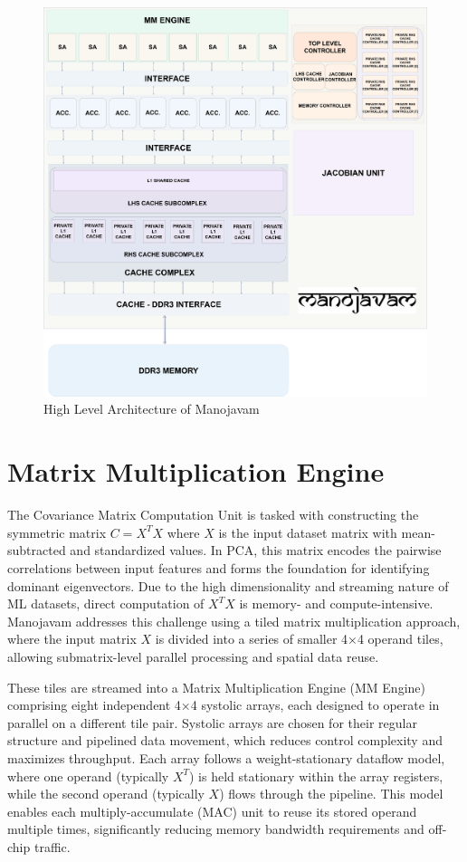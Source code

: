 \begin{figure}
	\centerline{\includegraphics[scale = 0.05]{Figures/manojavam_architecture_v4.png}}
	\caption{High Level Architecture of Manojavam}
	\label{fig:manojavam high level architecture}
\end{figure}

\section{Matrix Multiplication Engine}
The Covariance Matrix Computation Unit is tasked with constructing the symmetric matrix $C = X^{T}X$ where $X$ is the input dataset matrix with mean-subtracted and standardized values. In PCA, this matrix encodes the pairwise correlations between input features and forms the foundation for identifying dominant eigenvectors. Due to the high dimensionality and streaming nature of ML datasets, direct computation of $X^{T}X$ is memory- and compute-intensive. Manojavam addresses this challenge using a tiled matrix multiplication approach, where the input matrix $X$ is divided into a series of smaller 4×4 operand tiles, allowing submatrix-level parallel processing and spatial data reuse.

These tiles are streamed into a Matrix Multiplication Engine (MM Engine) comprising eight independent 4×4 systolic arrays, each designed to operate in parallel on a different tile pair. Systolic arrays are chosen for their regular structure and pipelined data movement, which reduces control complexity and maximizes throughput. Each array follows a weight-stationary dataflow model, where one operand (typically $X^{T}$) is held stationary within the array registers, while the second operand (typically $X$) flows through the pipeline. This model enables each multiply-accumulate (MAC) unit to reuse its stored operand multiple times, significantly reducing memory bandwidth requirements and off-chip traffic\cite{chap3-2}.

